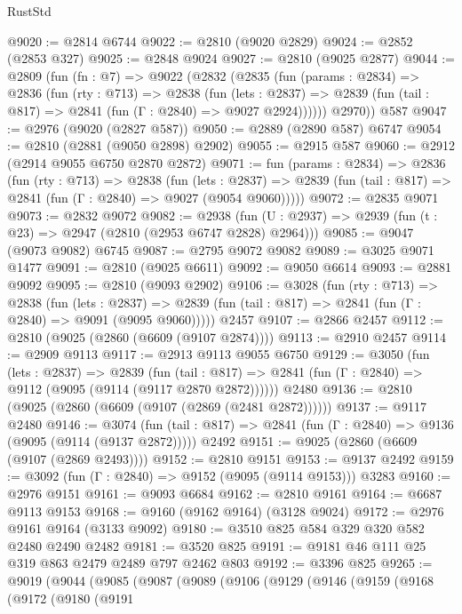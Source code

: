 \begin{lexlean}{RustStd}
\begin{coremodule}
@9020 := @2814 @6744
@9022 := @2810 (@9020 @2829)
@9024 := @2852 (@2853 @327)
@9025 := @2848 @9024
@9027 := @2810 (@9025 @2877)
@9044 := @2809
    (fun (fn : @7) =>
    @9022
      (@2832
        (@2835
          (fun (params : @2834) =>
          @2836
            (fun (rty : @713) =>
            @2838
              (fun (lets : @2837) =>
              @2839 (fun (tail : @817) => @2841 (fun (Γ : @2840) => @9027 @2924))))))
        @2970))
    @587
@9047 := @2976 (@9020 (@2827 @587))
@9050 := @2889 (@2890 @587) @6747
@9054 := @2810 (@2881 (@9050 @2898) @2902)
@9055 := @2915 @587
@9060 := @2912 (@2914 @9055 @6750 @2870 @2872)
@9071 := fun (params : @2834) =>
  @2836
    (fun (rty : @713) =>
    @2838
      (fun (lets : @2837) =>
      @2839 (fun (tail : @817) => @2841 (fun (Γ : @2840) => @9027 (@9054 @9060)))))
@9072 := @2835 @9071
@9073 := @2832 @9072
@9082 := @2938 (fun (U : @2937) => @2939 (fun (t : @23) => @2947 (@2810 (@2953 @6747 @2828) @2964)))
@9085 := @9047 (@9073 @9082) @6745
@9087 := @2795 @9072 @9082
@9089 := @3025 @9071 @1477
@9091 := @2810 (@9025 @6611)
@9092 := @9050 @6614
@9093 := @2881 @9092
@9095 := @2810 (@9093 @2902)
@9106 := @3028
    (fun (rty : @713) =>
    @2838
      (fun (lets : @2837) =>
      @2839 (fun (tail : @817) => @2841 (fun (Γ : @2840) => @9091 (@9095 @9060)))))
    @2457
@9107 := @2866 @2457
@9112 := @2810 (@9025 (@2860 (@6609 (@9107 @2874))))
@9113 := @2910 @2457
@9114 := @2909 @9113
@9117 := @2913 @9113 @9055 @6750
@9129 := @3050
    (fun (lets : @2837) =>
    @2839
      (fun (tail : @817) => @2841 (fun (Γ : @2840) => @9112 (@9095 (@9114 (@9117 @2870 @2872))))))
    @2480
@9136 := @2810 (@9025 (@2860 (@6609 (@9107 (@2869 (@2481 @2872))))))
@9137 := @9117 @2480
@9146 := @3074
    (fun (tail : @817) => @2841 (fun (Γ : @2840) => @9136 (@9095 (@9114 (@9137 @2872)))))
    @2492
@9151 := @9025 (@2860 (@6609 (@9107 (@2869 @2493))))
@9152 := @2810 @9151
@9153 := @9137 @2492
@9159 := @3092 (fun (Γ : @2840) => @9152 (@9095 (@9114 @9153))) @3283
@9160 := @2976 @9151
@9161 := @9093 @6684
@9162 := @2810 @9161
@9164 := @6687 @9113 @9153
@9168 := @9160 (@9162 @9164) (@3128 @9024)
@9172 := @2976 @9161 @9164 (@3133 @9092)
@9180 := @3510 @825 @584 @329 @320 @582 @2480 @2490 @2482
@9181 := @3520 @825
@9191 := @9181 @46 @111 @25 @319 @863 @2479 @2489 @797 @2462 @803
@9192 := @3396 @825
@9265 := @9019
    (@9044
      (@9085
        (@9087
          (@9089
            (@9106
              (@9129
                (@9146
                  (@9159
                    (@9168
                      (@9172
                        (@9180
                          (@9191

\end{coremodule}
\end{lexlean}
